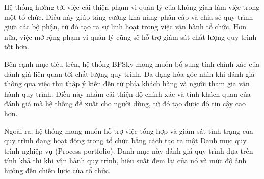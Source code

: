 
Hệ thống hướng tới việc cải thiện phạm vi quản lý của không gian làm việc trong một tổ chức. Điều này giúp tăng cường khả năng phân cấp và chia sẻ quy trình giữa các bộ phận, từ đó tạo ra sự linh hoạt trong việc vận hành tổ chức. Hơn nữa, việc mở rộng phạm vi quản lý cũng sẽ hỗ trợ giám sát chất lượng quy trình tốt hơn.

Bên cạnh mục tiêu trên, hệ thống BPSky mong muốn bổ sung tính chính xác của đánh giá liên quan tới chất lượng quy trình. Đa dạng hóa góc nhìn khi đánh giá thông qua việc thu thập ý kiến đến từ phía khách hàng và người tham gia vận hành quy trình. Điều này nhằm cải thiện độ chính xác và tính khách quan của đánh giá mà hệ thống đề xuất cho người dùng, từ đó tạo được độ tin cậy cao hơn.

Ngoài ra, hệ thống mong muốn hỗ trợ việc tổng hợp và giám sát tình trạng của quy trình đang hoạt động trong tổ chức bằng cách tạo ra một Danh mục quy trình nghiệp vụ (Process portfolio). Danh mục này đánh giá quy trình dựa trên tính khả thi khi vận hành quy trình, hiệu suất đem lại của nó và mức độ ảnh hưởng đến chiến lược của tổ chức.